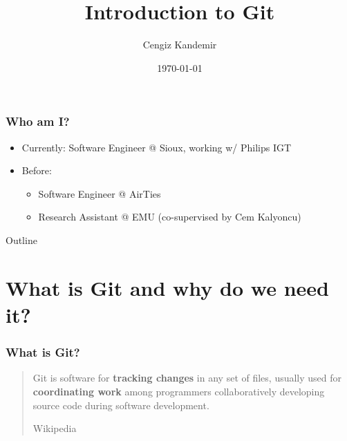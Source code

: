 \documentclass{beamer}
\title{Introduction to Git}
\author{Cengiz Kandemir}
\date{\today}
\begin{document}
\frame{\titlepage}

\begin{frame}
  \frametitle{Who am I?}
  \begin{itemize}
  \item[] Currently: Software Engineer @ Sioux, working w/ Philips IGT
  \item[] Before:
    \begin{itemize}
    \item[] Software Engineer @ AirTies
    \item[] Research Assistant @ EMU (co-supervised by Cem Kalyoncu)
    \end{itemize}
  \end{itemize}
\end{frame}

\begin{frame}{Outline}
  \tableofcontents
\end{frame}

\section{What is Git and why do we need it?}
\begin{frame}
  \frametitle{What is Git?}
  \begin{quote}
    Git is software for \textbf{tracking changes} in any set of files, usually used for \textbf{coordinating work} among programmers collaboratively developing source code during software development. \\ \begin{flushright}Wikipedia\end{flushright}
  \end{quote}
\end{frame}
\end{document}
